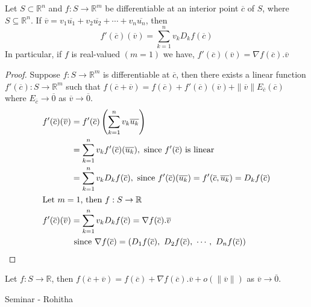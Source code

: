 \begin{theorem}
	Let $S \subset \mathbb{R}^n$ and $f : S \to \mathbb{R}^m$ be differentiable at an interior point $\overline{c}$ of $S$, where $S \subseteq \mathbb{R}^n$.
	If $\overline{v} = v_1\overline{u_1}+v_2\overline{u_2} + \cdots + v_n\overline{u_n}$, then
	\[ f'(\overline{c})(\overline{v}) = \sum_{k=1}^n v_k D_k f(\overline{c}) \]
	In particular, if $f$ is real-valued $(m = 1)$ we have, $f'(\overline{c})(\overline{v}) = \nabla{}f(\overline{c}).\overline{v}$
\end{theorem}
\begin{proof}
	Suppose $f : S \to \mathbb{R}^m$ is differentiable at $\overline{c}$, then there exists a linear function $f'(\overline{c}) : S \to \mathbb{R}^m$ such that $f(\overline{c}+\overline{v}) = f(\overline{c}) + f'(\overline{c})(\overline{v}) + \|\overline{v}\| E_{\overline{c}}(\overline{c})$ where $E_{\overline{c}} \to \overline{0}$ as $\overline{v} \to \overline{0}$.
	\begin{align*}
		f'(\overline{c})(\overline{v}) & = f'(\overline{c})\left(\sum_{k=1}^n v_k \overline{u_k}\right)\\
			& = \sum_{k=1}^n v_k f'(\overline{c})(\overline{u_k}), \text{ since $f'(\overline{c})$ is linear}\\
			& = \sum_{k=1}^n v_k D_k f(\overline{c}), \text{ since $f'(\overline{c})(\overline{u_k}) = f'(\overline{c},\overline{u_k}) = D_k f(\overline{c})$}\\
		\intertext{Let $m = 1$, then $f : S \to \mathbb{R}$ }
		f'(\overline{c})(\overline{v}) & = \sum_{k=1}^n v_k D_k f(\overline{c}) = \nabla{}f(\overline{c}).\overline{v}\\
		& \text{ since } \nabla{}f(\overline{c}) = \left( D_1f(\overline{c}),\ D_2f(\overline{c}),\ \cdots ,\ D_nf(\overline{c}) \right)
	\end{align*}
\end{proof}

\begin{remark}
	Let $f : S \to \mathbb{R}$, then $f(\overline{c} +\overline{v}) = f (\overline{c}) + \nabla{}f(\overline{c}).\overline{v} + o(\|\overline{v}\|)$ as $\overline{v} \to \overline{0}$.
\end{remark}

\begin{remark}Seminar - Rohitha
\end{remark}


